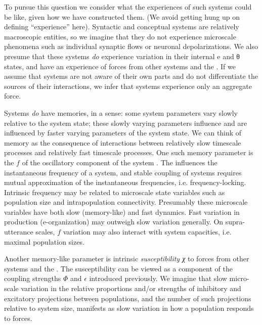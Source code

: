   To pursue this question we consider what the experiences of such systems could be like, given how we have constructed them. (We avoid getting hung up on defining “experience” here). Syntactic and conceptual systems are relatively macroscopic entities, so we imagine that they do not experience microscale phenomena such as individual synaptic flows or neuronal depolarizations. We also presume that these systems \textit{do} experience variation in their internal e and θ states, and have an experience of forces from other systems and the . If we assume that systems are not aware of their own parts and do not differentiate the sources of their interactions, we infer that systems experience only an aggregate force. 

  Systems \textit{do} have memories, in a sense: some system parameters vary slowly relative to the system state; these slowly varying parameters influence and are influenced by faster varying parameters of the system state. We can think of memory as the consequence of interactions between relatively slow timescale processes and relatively fast timescale processes. One such memory parameter is the  $f$ of the oscillatory component of the system . The  influences the instantaneous frequency of a system, and stable coupling of systems requires mutual approximation of the instantaneous frequencies, i.e. frequency-locking. Intrinsic frequency may be related to microscale state variables such as population size and intrapopulation connectivity. Presumably these microscale variables have both slow (memory-like) and fast dynamics. Fast variation in production (e-organization) may outweigh slow variation generally. On supra-utterance scales, $f$ variation may also interact with system capacities, i.e. maximal population sizes. 

  Another memory-like parameter is intrinsic \textit{susceptibility χ} to forces from other systems and the . The susceptibility can be viewed as a component of the coupling strengths $\Phi$ and $\epsilon$ introduced previously. We imagine that slow micro-scale variation in the relative proportions and/or strengths of inhibitory and excitatory projections between populations, and the number of such projections relative to system size, manifests as slow variation in how a population responds to forces.


